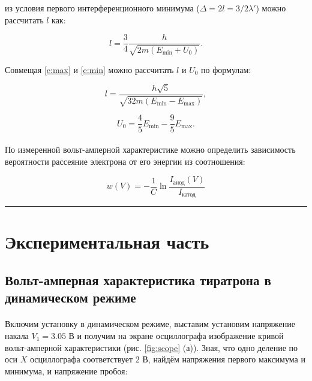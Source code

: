 \documentclass[a4paper,12pt]{article} %
\begin{document}
\noindent из условия первого интерференционного минимума ($\Delta = 2l = 3/2 \lambda'$) можно рассчитать $l$ как:

\begin{equation}\label{e:min}
l = \frac{3}{4} \frac{h}{\sqrt{2m(E_{\min} + U_0)}}.
\end{equation}

Совмещая \eqref{e:max} и \eqref{e:min} можно рассчитать $l$ и $U_0$ по формулам:

\begin{equation}\label{e:l}
l = \frac{h\sqrt{5}}{\sqrt{32m(E_{\min} - E_{\max})}},
\end{equation}

\begin{equation}\label{e:u_0}
U_0 = \frac{4}{5} E_{\min} - \frac{9}{5} E_{\max}.
\end{equation}

\paragraph{} По измеренной вольт-амперной характеристике можно определить зависимость вероятности рассеяние электрона от его энергии из соотношения:

\begin{equation}\label{e:prob}
w(V) = - \frac{1}{C} \ln{\frac{I_\text{анод}(V)}{I_\text{катод}}}
\end{equation}

\medskip\hrule\medskip

\FloatBarrier
\section{Экспериментальная часть}

\subsection{Вольт-амперная характеристика тиратрона в динамическом режиме}\label{ss:dynamic}

\paragraph{} Включим установку в динамическом режиме, выставим установим напряжение накала $V_1 = 3.05$ В и получим на экране осциллографа изображение кривой вольт-амперной характеристики (рис. \ref{fig:scope} (а)). Зная, что одно деление по оси $X$ осциллографа соответствует 2 В, найдём напряжения первого максимума и минимума, и  напряжение пробоя: 
\end{document}
